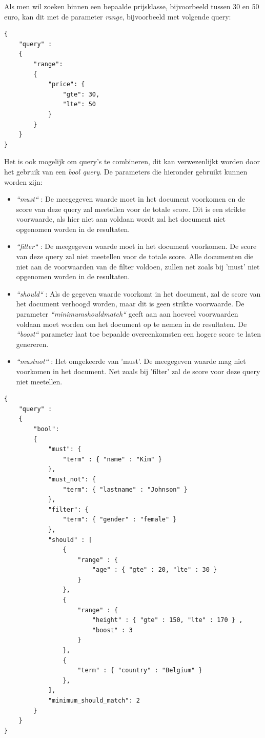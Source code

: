 Als men wil zoeken binnen een bepaalde prijsklasse, bijvoorbeeld tussen 30 en 50 euro, kan dit met de parameter \textit{range}, bijvoorbeeld met volgende query:

\begin{lstlisting}[caption={Bereik zoeken: Een query om alle documenten op te halen waarbij het veld 'price' tussen 30 en 50 ligt}]
{
	"query" : 
	{
		"range": 
		{
			"price": {
				"gte": 30,
				"lte": 50
			}
		}
	}
}
\end{lstlisting}


Het is ook mogelijk om query's te combineren, dit kan verwezenlijkt worden door het gebruik van een \textit{bool query}. De parameters die hieronder gebruikt kunnen worden zijn:

\begin{itemize}
	\setlength\itemsep{1em}
	\item \textit{``must``} : De meegegeven waarde moet in het document voorkomen en de score van deze query zal meetellen voor de totale score. Dit is een strikte voorwaarde, als hier niet aan voldaan wordt zal het document niet opgenomen worden in de resultaten.	
	\item \textit{``filter``} : De meegegeven waarde moet in het document voorkomen. De score van deze query zal niet meetellen voor de totale score. Alle documenten die niet aan de voorwaarden van de filter voldoen, zullen net zoals bij 'must' niet opgenomen worden in de resultaten.	
	\item \textit{``should``} : Als de gegeven waarde voorkomt in het document, zal de score van het document verhoogd worden, maar dit is geen strikte voorwaarde. De parameter \textit{``minimum\textunderscore should\textunderscore match``} geeft aan aan hoeveel voorwaarden voldaan moet worden om het document op te nemen in de resultaten. De \textit{``boost``} parameter laat toe bepaalde overeenkomsten een hogere score te laten genereren.
	\item \textit{``must\textunderscore not``} : Het omgekeerde van 'must'. De meegegeven waarde mag niet voorkomen in het document. Net zoals bij 'filter' zal de score voor deze query niet meetellen. 
\end{itemize}

\begin{lstlisting}[caption={Combineren: Voorbeeld van een 'bool' query}]
{
	"query" : 
	{
		"bool": 
		{
			"must": {
				"term" : { "name" : "Kim" }
			},
			"must_not": {
				"term": { "lastname" : "Johnson" }
			},
			"filter": {
				"term": { "gender" : "female" }
			},
			"should" : [
				{
					"range" : {
						"age" : { "gte" : 20, "lte" : 30 }
					}
				},
				{
					"range" : {
						"height" : { "gte" : 150, "lte" : 170 } ,
						"boost" : 3
					}
				},
				{
					"term" : { "country" : "Belgium" }
				},
			],
			"minimum_should_match": 2
		}
	}
}
\end{lstlisting}
 
